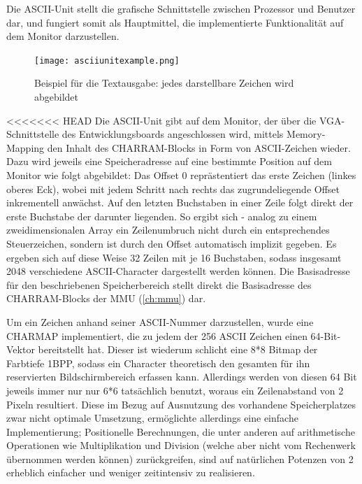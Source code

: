 
\label{ch:asciiunit}
Die ASCII-Unit stellt die grafische Schnittstelle zwischen Prozessor und Benutzer dar, und fungiert somit als Hauptmittel, die implementierte Funktionalit\"at auf dem Monitor darzustellen.

\begin{figure}[!htbp]
	\centering
	\label{fig:exampletext}
	\texttt{[image: asciiunitexample.png]}
	\caption[Beispiel f\"ur die Textausgabe]{Beispiel f\"ur die Textausgabe: jedes darstellbare Zeichen wird abgebildet}
\end{figure}


<<<<<<< HEAD
Die ASCII-Unit gibt auf dem Monitor, der \"uber die VGA-Schnittstelle des Entwicklungsboards angeschlossen wird, mittels Memory-Mapping den Inhalt des CHARRAM-Blocks in Form von ASCII-Zeichen wieder. Dazu wird jeweils eine Speicheradresse auf eine bestimmte Position auf dem Monitor wie folgt abgebildet: Das Offset 0 repr\"astentiert das erste Zeichen (linkes oberes Eck), wobei mit jedem Schritt nach rechts das zugrundeliegende Offset inkrementell anw\"achst. Auf den letzten Buchstaben in einer Zeile folgt direkt der erste Buchstabe der darunter liegenden. So ergibt sich - analog zu einem zweidimensionalen Array ein Zeilenumbruch nicht durch ein entsprechendes Steuerzeichen, sondern ist durch den Offset automatisch implizit gegeben. Es ergeben sich auf diese Weise 32 Zeilen mit je 16 Buchstaben, sodass insgesamt 2048 verschiedene ASCII-Character dargestellt werden k\"onnen. Die Basisadresse f\"ur den beschriebenen Speicherbereich stellt direkt die Basisadresse des CHARRAM-Blocks der MMU (\ref{ch:mmu}) dar.

Um ein Zeichen anhand seiner ASCII-Nummer darzustellen, wurde eine CHARMAP implementiert, die zu jedem der 256 ASCII Zeichen einen 64-Bit-Vektor bereitstellt hat. Dieser ist wiederum schlicht eine 8*8 Bitmap der Farbtiefe 1BPP, sodass ein Character theoretisch den gesamten f\"ur ihn reservierten Bildschirmbereich erfassen kann. Allerdings  werden von diesen 64 Bit jeweils immer nur nur 6*6 tats\"achlich benutzt, woraus ein Zeilenabstand von 2 Pixeln resultiert. Diese im Bezug auf Ausnutzung des vorhandene Speicherplatzes zwar nicht optimale Umsetzung, erm\"oglichte allerdings eine einfache Implementierung; Positionelle Berechnungen, die unter anderen auf arithmetische Operationen wie Multiplikation und Division (welche aber nicht vom Rechenwerk \"ubernommen werden k\"onnen) zur\"uckgreifen, sind auf nat\"urlichen Potenzen von 2 erheblich einfacher und weniger zeitintensiv zu realisieren.

